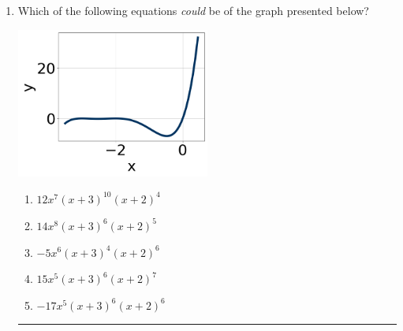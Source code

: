 \documentclass[14pt]{extbook}
\newcommand{\litem}[1]{\item#1\hspace*{-1cm}\rule{\textwidth}{0.4pt}}
\begin{document}
\begin{enumerate}
\litem{
Which of the following equations \textit{could} be of the graph presented below?
\begin{center}
    \includegraphics[width=0.5\textwidth]{../Figures/polyGraphToFunctionCopyC.png}
\end{center}
\begin{enumerate}[label=\Alph*.]
\item \( 12x^{7} (x + 3)^{10} (x + 2)^{4} \)
\item \( 14x^{8} (x + 3)^{6} (x + 2)^{5} \)
\item \( -5x^{6} (x + 3)^{4} (x + 2)^{6} \)
\item \( 15x^{5} (x + 3)^{6} (x + 2)^{7} \)
\item \( -17x^{5} (x + 3)^{6} (x + 2)^{6} \)


\end{enumerate}}
\end{enumerate}
\end{document}
